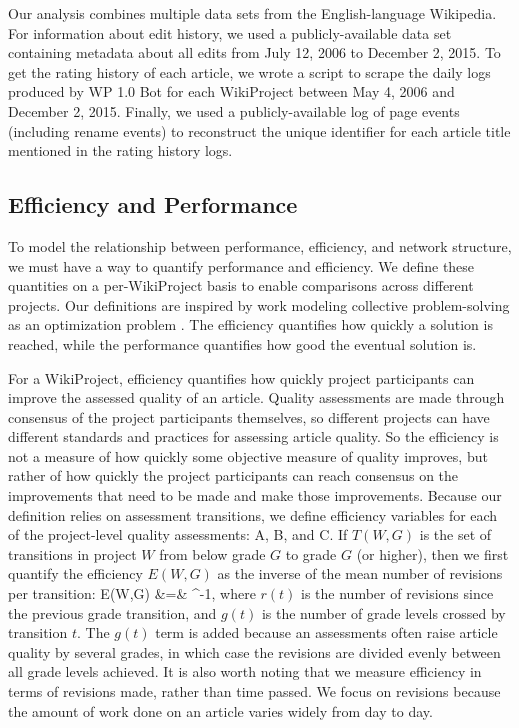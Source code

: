 Our analysis combines multiple data sets from the English-language Wikipedia.
For information about edit history, we used a publicly-available data set containing
metadata about all edits from July 12, 2006 to December 2, 2015.
To get the rating history of each article,
we wrote a script to scrape the daily logs produced by WP 1.0 Bot for each WikiProject
between May 4, 2006 and December 2, 2015.
Finally, we used a publicly-available log of page events (including rename events)
to reconstruct the unique identifier for each article title mentioned in the rating history logs.

\subsection{Efficiency and Performance}

To model the relationship between performance, efficiency, and network structure,
we must have a way to quantify performance and efficiency.
We define these quantities on a per-WikiProject basis to enable comparisons across different
projects.
Our definitions are inspired by work modeling collective problem-solving as an optimization
problem \cite{lazer_network_2007, mason_propagation_2008, mason_collaborative_2012,
grim_scientific_2013, barkoczi_social_2016}.
The efficiency quantifies how quickly a solution is reached,
while the performance quantifies how good the eventual solution is.

For a WikiProject, efficiency quantifies how quickly project participants can improve the
assessed quality of an article.
Quality assessments are made through consensus of the project participants themselves,
so different projects can have different standards and practices for assessing article quality.
So the efficiency is not a measure of how quickly some objective measure of quality improves,
but rather of how quickly the project participants can reach consensus on the improvements that
need to be made and make those improvements.
Because our definition relies on assessment transitions, we define efficiency variables for
each of the project-level quality assessments: A, B, and C.
If $T(W,G)$ is the set of transitions in project $W$ from below grade $G$ to grade $G$ (or higher),
then we first quantify the efficiency $E(W,G)$ as the inverse of the mean number of revisions
per transition:
\beq
E(W,G)
&=&
^{-1},
\eeq
where $r(t)$ is the number of revisions since the previous grade transition,
and $g(t)$ is the number of grade levels crossed by transition $t$.
The $g(t)$ term is added because an assessments often raise article quality by several
grades, in which case the revisions are divided evenly between all grade levels achieved.
It is also worth noting that we measure efficiency in terms of revisions made,
rather than time passed.
We focus on revisions because the amount of work done on an article varies widely from day to day.

